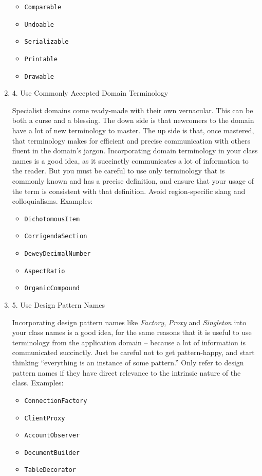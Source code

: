 \documentclass{article}
\begin{document}
\begin{enumerate}
\begin{itemize}
\item \texttt{Comparable}
\item \texttt{Undoable}
\item \texttt{Serializable}
\item \texttt{Printable}
\item \texttt{Drawable}
\end{itemize}

\item 4. Use Commonly Accepted Domain Terminology
\label{sec:orgheadline267}

Specialist domains come ready-made with their own vernacular. This can
be both a curse and a blessing. The down side is that newcomers to the
domain have a lot of new terminology to master. The up side is that,
once mastered, that terminology makes for efficient and precise
communication with others fluent in the domain's jargon. Incorporating
domain terminology in your class names is a good idea, as it succinctly
communicates a lot of information to the reader. But you must be careful
to use only terminology that is commonly known and has a precise
definition, and ensure that your usage of the term is consistent with
that definition. Avoid region-specific slang and colloquialisms.
Examples:

\begin{itemize}
\item \texttt{DichotomousItem}
\item \texttt{CorrigendaSection}
\item \texttt{DeweyDecimalNumber}
\item \texttt{AspectRatio}
\item \texttt{OrganicCompound}
\end{itemize}

\item 5. Use Design Pattern Names
\label{sec:orgheadline268}

Incorporating design pattern names like \emph{Factory}, \emph{Proxy} and
\emph{Singleton} into your class names is a good idea, for the same reasons
that it is useful to use terminology from the application domain --
because a lot of information is communicated succinctly. Just be careful
not to get pattern-happy, and start thinking “everything is an instance
of some pattern.” Only refer to design pattern names if they have direct
relevance to the intrinsic nature of the class. Examples:

\begin{itemize}
\item \texttt{ConnectionFactory}
\item \texttt{ClientProxy}
\item \texttt{AccountObserver}
\item \texttt{DocumentBuilder}
\item \texttt{TableDecorator}
\end{itemize}


\end{enumerate}
\end{document}
